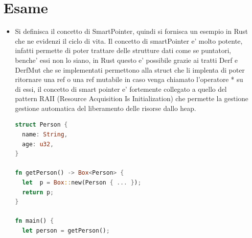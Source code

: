\documentclass[12pt]{article}
\begin{document}
\section{Esame}
\begin{itemize}
  \item Si definisca il concetto di SmartPointer, quindi si fornisca un esempio in Rust che ne evidenzi il ciclo di vita. Il concetto di smartPointer e' molto potente, infatti permette di poter trattare delle strutture dati come se puntatori, benche' essi non lo siano, in Rust questo e' possibile grazie ai tratti Derf e DerfMut che se implementati permettono alla struct che li implenta di poter ritornare una ref o una ref mutabile in caso venga chiamato l'operatore * su di essi, il concetto di smart pointer e' fortemente collegato a quello del pattern RAII (Resource Acquisition Is Initialization) che permette la gestione gestione automatica del liberamento delle risorse dallo heap.
  \begin{lstlisting}[language=rust]
struct Person {
  name: String,
  age: u32,
}

fn getPerson() -> Box<Person> {
  let  p = Box::new(Person { ... });
  return p;
}

fn main() {
  let person = getPerson();
  

\end{lstlisting}
\end{itemize}
\end{document}
